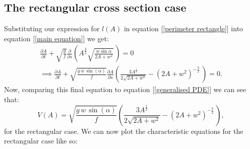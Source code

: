\documentclass{article}
\begin{document}
\subsection{The rectangular cross section case}
Substituting our expression for $l(A)$ in equation [\ref{perimeter rectangle}] into equation [\ref{main equation}] we get: 
\begin{align}
    \frac{\partial A}{\partial t} + \sqrt {\frac{g}{f}} \frac{\partial}{\partial s}\left( A^{\frac{3}{2}} \sqrt{\frac{w\sin \alpha} {2A +w^2}} \, \right) = 0 \\
    \implies \frac{\partial A}{\partial t} + \sqrt {\frac{g \,w\,\sin(\alpha)}{f}} \frac{\partial A}{\partial s}\left(\frac{3A^{\frac{1}{2}}}{2\sqrt{2A +w^2}} - (2A + w^2)^{-\frac{3}{2}}\, \right) = 0.
\end{align}
Now, comparing this final equation to equation [\ref{generalised PDE}] we can see that:
\begin{equation}
   V(A) =  \sqrt {\frac{g \,w\,\sin(\alpha)}{f}} \left(\frac{3A^{\frac{1}{2}}}{2\sqrt{2A +w^2}} - (2A + w^2)^{-\frac{3}{2}}\, \right),
\end{equation}
for the rectangular case. We can now plot the characteristic equations for the rectangular case like so: 
\end{document}
